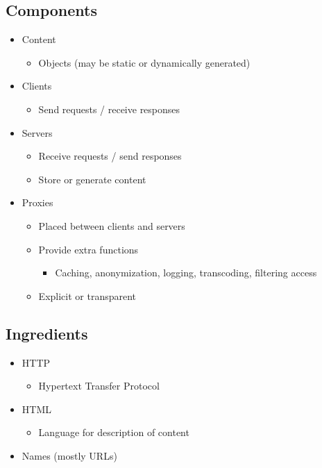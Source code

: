 \subsection{Components}
\begin{itemize}
    \item Content
          \begin{itemize}[nosep]
              \item Objects (may be static or dynamically generated)
          \end{itemize}
    \item Clients
          \begin{itemize}[nosep]
              \item Send requests / receive responses
          \end{itemize}
    \item Servers
          \begin{itemize}[nosep]
              \item Receive requests / send responses
              \item Store or generate content
          \end{itemize}
    \item Proxies
          \begin{itemize}[nosep]
              \item Placed between clients and servers
              \item Provide extra functions
                    \begin{itemize}[nosep]
                        \item Caching, anonymization, logging, transcoding, filtering access
                    \end{itemize}
              \item Explicit or transparent
          \end{itemize}
\end{itemize}
\subsection{Ingredients}
\begin{itemize}[nosep]
    \item HTTP
          \begin{itemize}[nosep]
              \item Hypertext Transfer Protocol
          \end{itemize}
    \item HTML
          \begin{itemize}[nosep]
              \item Language for description of content
          \end{itemize}
    \item Names (mostly URLs)
\end{itemize}
